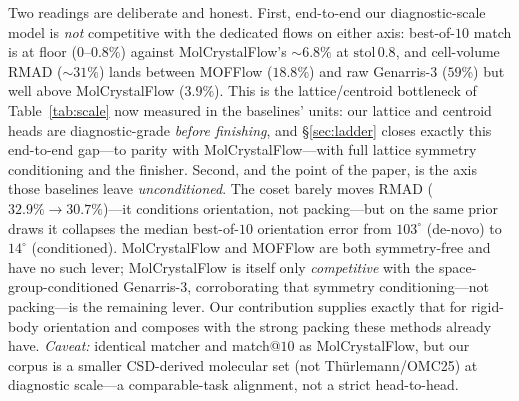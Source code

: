 \documentclass[journal=jcisd8,manuscript=article]{achemso}
\begin{document}
Two readings are deliberate and honest. First, end-to-end our diagnostic-scale
model is \emph{not} competitive with the dedicated flows on either axis:
best-of-$10$ match is at floor ($0$--$0.8\%$) against MolCrystalFlow's $\sim\!6.8\%$
at $\text{stol}\,0.8$, and cell-volume RMAD ($\sim\!31\%$) lands between MOFFlow
($18.8\%$) and raw Genarris-3 ($59\%$) but well above MolCrystalFlow ($3.9\%$).
This is the lattice/centroid bottleneck of Table~\ref{tab:scale} now measured in
the baselines' units: our lattice and centroid heads are diagnostic-grade
\emph{before finishing}, and \S\ref{sec:ladder} closes exactly this end-to-end
gap---to parity with MolCrystalFlow---with full lattice symmetry conditioning and
the finisher. Second, and the point of the paper, is the axis those baselines leave
\emph{unconditioned}. The coset barely moves RMAD ($32.9\%\!\to\!30.7\%$)---it
conditions orientation, not packing---but on the same prior draws it collapses the
median best-of-$10$ orientation error from $103^\circ$ (de-novo) to $14^\circ$
(conditioned). MolCrystalFlow and MOFFlow are both symmetry-free and have no such
lever; MolCrystalFlow is itself only \emph{competitive} with the
space-group-conditioned Genarris-3, corroborating that symmetry conditioning---not
packing---is the remaining lever. Our contribution supplies exactly that for
rigid-body orientation and composes with the strong packing these methods already
have. \emph{Caveat:} identical matcher and match@$10$ as MolCrystalFlow, but our
corpus is a smaller CSD-derived molecular set (not Th\"urlemann/OMC25) at diagnostic
scale---a comparable-task alignment, not a strict head-to-head.
\end{document}
